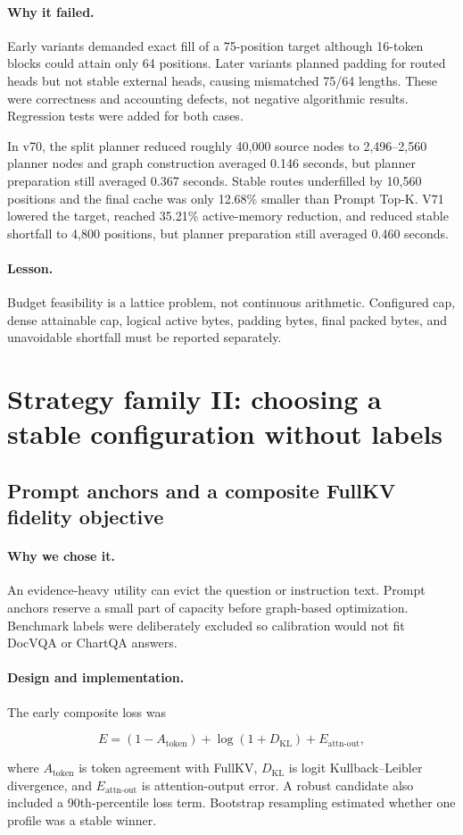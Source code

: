 \documentclass[11pt]{article}
\newcommand{\lesson}{\paragraph{Lesson.}}
\newcommand{\reason}{\paragraph{Why we chose it.}}
\newcommand{\design}{\paragraph{Design and implementation.}}
\newcommand{\failure}{\paragraph{Why it failed.}}
\begin{document}
\failure
Early variants demanded exact fill of a 75-position target although 16-token blocks could attain
only 64 positions.  Later variants planned padding for routed heads but not stable external heads,
causing mismatched 75/64 lengths.  These were correctness and accounting defects, not negative
algorithmic results.  Regression tests were added for both cases.

In v70, the split planner reduced roughly 40,000 source nodes to 2,496--2,560 planner nodes and
graph construction averaged 0.146 seconds, but planner preparation still averaged 0.367 seconds.
Stable routes underfilled by 10,560 positions and the final cache was only 12.68\% smaller than
Prompt Top-K.  V71 lowered the target, reached 35.21\% active-memory reduction, and reduced stable
shortfall to 4,800 positions, but planner preparation still averaged 0.460 seconds.

\lesson
Budget feasibility is a lattice problem, not continuous arithmetic.  Configured cap, dense
attainable cap, logical active bytes, padding bytes, final packed bytes, and unavoidable shortfall
must be reported separately.

\section{Strategy family II: choosing a stable configuration without labels}

\subsection{Prompt anchors and a composite FullKV fidelity objective}

\reason
An evidence-heavy utility can evict the question or instruction text.  Prompt anchors reserve a
small part of capacity before graph-based optimization.  Benchmark labels were deliberately
excluded so calibration would not fit DocVQA or ChartQA answers.

\design
The early composite loss was

\begin{equation}
 E=(1-A_{\mathrm{token}})+\log(1+D_{\mathrm{KL}})+E_{\mathrm{attn\mbox{-}out}},
\end{equation}

where $A_{\mathrm{token}}$ is token agreement with FullKV, $D_{\mathrm{KL}}$ is logit Kullback--Leibler
divergence, and $E_{\mathrm{attn\mbox{-}out}}$ is attention-output error.  A robust candidate also
included a 90th-percentile loss term.  Bootstrap resampling estimated whether one profile was a
stable winner.
\end{document}
